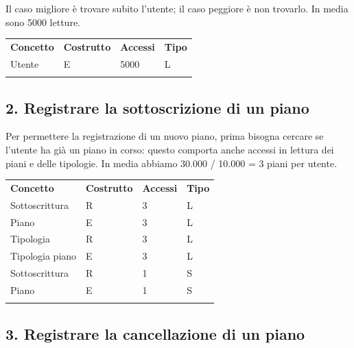 \documentclass[a4paper,12pt]{report}
\begin{document}
Il caso migliore è trovare subito l'utente; il caso peggiore è non trovarlo. In media sono 5000 letture.

\begin{table}[!htb]
\begin{center}
	\begin{tabular}{ | m{4cm} P{4cm} P{4cm} P{4cm} | }
	 \textbf{Concetto} & \textbf{Costrutto} & \textbf{Accessi} & \textbf{Tipo} \\
	Utente         & E & 5000 & L \\ \hline
	  \\ \hline
	\end{tabular}
\end{center}
\end{table}

\subsection*{2. Registrare la sottoscrizione di un piano}

Per permettere la registrazione di un nuovo piano, prima bisogna cercare se l'utente ha già un piano in corso: questo comporta anche accessi in lettura dei piani e delle tipologie. In media abbiamo 30.000 / 10.000 = 3 piani per utente.

\begin{table}[!htb]
\begin{center}
	\begin{tabular}{ | m{4cm} P{4cm} P{4cm} P{4cm} | }
	 \textbf{Concetto} & \textbf{Costrutto} & \textbf{Accessi} & \textbf{Tipo} \\
	Sottoscrittura  & R & 3 & L \\ \hline
	Piano           & E & 3 & L \\ \hline
	Tipologia       & R & 3 & L \\ \hline
	Tipologia piano & E & 3 & L \\ \hline
	Sottoscrittura  & R & 1 & S \\ \hline
	Piano           & E & 1 & S \\ \hline
	  \\ \hline
	\end{tabular}
\end{center}
\end{table}

\subsection*{3. Registrare la cancellazione di un piano}
\end{document}
